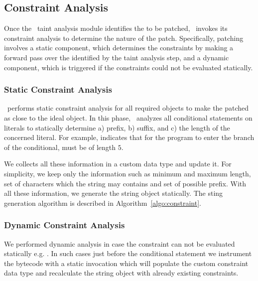 \subsection{Constraint Analysis}
\label{subsec:constraint analysis}

Once the \infoflow\ taint analysis module identifies the  to be
patched, \tool\ invokes its constraint analysis to determine the nature of the
patch. Specifically, patching involves a static component, which determines the
constraints by making a forward pass over the  identified by the
taint analysis step, and a dynamic component, which is triggered if the
constraints could not be evaluated statically.

\subsubsection{Static Constraint Analysis}
\label{subsubsec:staticConstraint}

\tool\ performs static constraint analysis for all required 
objects to make the patched  as close to the ideal object. In this
phase, \tool\ analyzes all conditional statements on  literals to
statically determine a) prefix, b) suffix, and c) the length of the concerned
 literal. For example,  indicates that
for the program to enter the  branch of the conditional, 
must be of length $5$.

We collects all these information in a custom data type
and update it. For simplicity, we keep only the information such as minimum and
maximum length, set of characters which the string
may contains and set of possible prefix. With all these information, we generate 
the string object statically. The sting generation algorithm is described in
Algorithm~\ref{algo:constraint}. 

\subsubsection{Dynamic Constraint Analysis}
\label{subsubsec:dynamicConstraint}

We performed dynamic analysis in case the constraint can not be evaluated 
statically e.g. . In such cases just
before the conditional statement we instrument the bytecode with a static 
invocation which will populate the custom constraint data type and recalculate 
the string object with already existing constraints.

